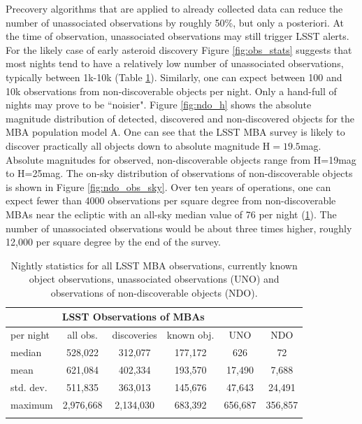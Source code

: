 Precovery algorithms that are applied to already collected data can reduce the number of unassociated observations by roughly 50\%, but only a posteriori.
At the time of observation, unassociated observations may still trigger \gls{LSST} alerts.
For the likely case of early asteroid discovery Figure \ref{fig:obs_stats} suggests that most nights tend to have a relatively low number of unassociated observations, typically between 1k-10k (Table \ref{tab:obs_stats}). Similarly, one can expect between 100 and 10k observations from non-discoverable objects per night. Only a hand-full of nights may prove to be ``noisier".
Figure \ref{fig:ndo_h} shows the absolute magnitude distribution of detected, discovered and non-discovered objects for the \gls{MBA} population model A.
One can see that the \gls{LSST} \gls{MBA} survey is likely to discover practically all objects down to absolute magnitude H$=19.5$mag.
Absolute magnitudes for observed, non-discoverable objects range from H=19mag to H=25mag.
The on-sky distribution of observations of non-discoverable objects is shown in Figure \ref{fig:ndo_obs_sky}. Over ten years of operations, one can expect fewer than 4000 observations per square degree from non-discoverable MBAs near the ecliptic with an all-sky median value of 76 per night (\ref{tab:obs_stats}). The number of unassociated observations would be about three times higher, roughly 12,000 per square degree by the end of the survey.
%
\begin{table}[tb!]
\begin{center}
\begin{tabular}{lccccc}
\multicolumn{5}{c}{LSST Observations of MBAs}\\
\hline\hline
per night & all obs. & discoveries & known obj. & \gls{UNO} & \gls{NDO} \\\hline
median  & 528,022 &312,077  &177,172 &626 &72 \\
mean & 621,084 & 402,334 & 193,570 & 17,490 & 7,688 \\
std. dev. & 511,835 & 363,013& 145,676 &47,643 & 24,491\\
maximum & 2,976,668 & 2,134,030 & 683,392 & 656,687 & 356,857\\
\hline\hline\\
\end{tabular}
\end{center}
\caption{Nightly statistics for all \gls{LSST} \gls{MBA} observations, currently known object observations, unassociated observations (\gls{UNO}) and observations of
non-discoverable objects (\gls{NDO}).}
\label{tab:obs_stats}
\end{table}
%


